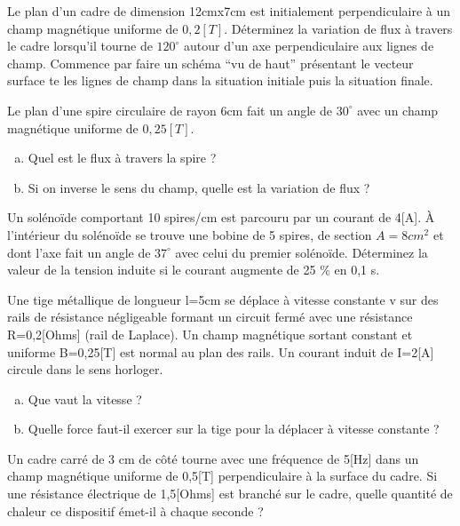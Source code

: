 \begin{exercise}
    Le plan d'un cadre de dimension 12cmx7cm est initialement perpendiculaire à un champ magnétique uniforme de \(0,2[T]\). Déterminez la variation de flux à travers le cadre lorsqu'il tourne de \(120^{\circ}\) autour d'un axe perpendiculaire aux lignes de champ.
    Commence par faire un schéma \enquote{vu de haut} présentant le vecteur surface te les lignes de champ dans la situation initiale puis la situation finale.
\end{exercise}

\begin{exercise}
    Le plan d'une spire circulaire de rayon 6cm fait un angle de \(30^{\circ}\) avec un champ magnétique uniforme de \(0,25[T]\).
    \begin{enumerate}[a)]
        \item Quel est le flux à travers la spire ?
        \item Si on inverse le sens du champ, quelle est la variation de flux ?
    \end{enumerate}
\end{exercise}

\begin{exercise}
    Un solénoïde comportant 10 spires/cm est parcouru par un courant de 4[A]. À l'intérieur du solénoïde se trouve une bobine de 5 spires, de section \(A=8cm^2\) et dont l'axe fait un angle de \(37^{\circ}\) avec celui du premier solénoïde. Déterminez la valeur de la tension induite si le courant augmente de 25 \% en 0,1 s.
\end{exercise}

\begin{exercise}
    Une tige métallique de longueur l=5cm se déplace à vitesse constante v sur des rails de résistance négligeable formant un circuit fermé avec une résistance R=0,2[Ohms] (rail de Laplace). Un champ magnétique sortant constant et uniforme B=0,25[T] est normal au plan des rails. Un courant induit de I=2[A] circule dans le sens horloger.
    \begin{enumerate}[a)]
        \item Que vaut la vitesse ?
        \item Quelle force faut-il exercer sur la tige pour la déplacer à vitesse constante ?
    \end{enumerate}
\end{exercise}

\begin{exercise}
    Un cadre carré de 3 cm de côté tourne avec une fréquence de 5[Hz] dans un champ magnétique uniforme de 0,5[T] perpendiculaire à la surface du cadre. Si une résistance électrique de 1,5[Ohms] est branché sur le cadre, quelle quantité de chaleur ce dispositif émet-il à chaque seconde ?
\end{exercise}

